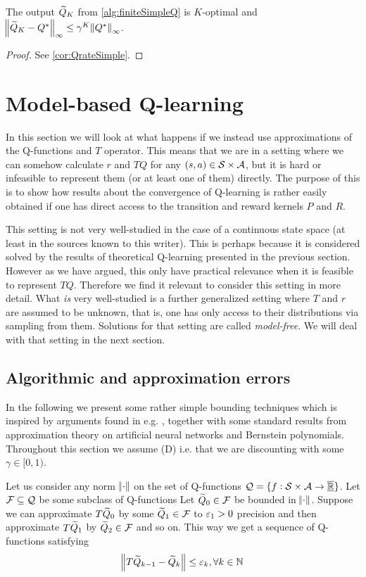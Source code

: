 \begin{prop}
  The output $\widetilde{Q}_K$ from \cref{alg:finiteSimpleQ} is
  $K$-optimal and
  $\norm{\widetilde{Q}_K - Q^*}_\infty \leq \gamma^K \norm{Q^*}_\infty$.
\end{prop}
\begin{proof}
  See \cref{cor:QrateSimple}.
\end{proof}

\section{Model-based Q-learning}
In this section we will look at what happens if we
instead use approximations of the Q-functions and $T$ operator.
This means that we are in a setting where we can somehow
calculate $r$ and $TQ$ for any $(s,a) \in \mathcal{S} \times \mathcal{A}$,
but it is hard or infeasible to represent them (or at least one of them)
directly.
The purpose of this is to show how results about the convergence of Q-learning
is rather easily obtained if one has direct access
to the transition and reward kernels $P$ and $R$.

This setting is not very well-studied in the case of a
continuous state space (at least in the sources known to this writer).
This is perhaps because it is considered solved
by the results of theoretical Q-learning presented in the previous section.
However as we have argued, this only have practical relevance 
when it is feasible to represent $TQ$.
Therefore we find it relevant to consider this setting in more detail.
What \emph{is} very well-studied is a further generalized setting
where $T$ and $r$ are assumed to be unknown,
that is, one has only access to their distributions via sampling from them.
Solutions for that setting are called \emph{model-free}.
We will deal with that setting in the next section.

\subsection{Algorithmic and approximation errors}

In the following we present some rather simple bounding techniques
which is inspired by arguments found in e.g. ,
together with some standard results from approximation theory
on artificial neural networks and Bernstein polynomials.
Throughout this section we assume (D)
i.e. that we are discounting with some $\gamma \in [0,1)$.

Let us consider any norm $\norm{\cdot}$ on
the set of Q-functions $\mathcal{Q} = \{ f: \mathcal{S} \times \mathcal{A} \to \overline{\underline{\mathbb{R}}}\}$.
Let $\mathcal{F} \subseteq \mathcal{Q}$ be some subclass of Q-functions
Let $\widetilde{Q}_0 \in \mathcal{F}$ be bounded in $\norm{\cdot}$.
Suppose we can approximate $T\widetilde{Q}_0$ by some $\widetilde{Q}_1 \in \mathcal{F}$
to $\varepsilon_1 > 0$ precision and then approximate $T\widetilde{Q}_1$ by $\widetilde{Q}_2 \in \mathcal{F}$
and so on. This way we get a sequence of Q-functions satisfying
\[ \norm{T\widetilde{Q}_{k-1} - \widetilde{Q}_k} \leq \varepsilon_k, \forall k \in \mathbb{N} \]

